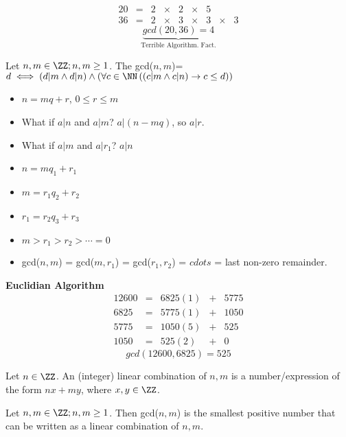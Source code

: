 \begin{example}
\[ \begin{matrix}20 & = & 2 & \times & 2 & \times & 5 \\
         36 & = & 2 & \times & 3 & \times & 3 & \times & 3\end{matrix}\]
\[\underbrace{gcd(20,36)=4}_{\text{Terrible Algorithm. Fact.}}\]
\end{example}
\begin{definition}
Let $n,m\in \ZZ; n,m \ge 1$. The gcd($n,m$)=$d \iff (d|m \wedge d|n) \wedge \left( \forall c \in \NN \left( (c|m \wedge c|n) \to c \le d \right) \right)$

\begin{itemize}
\item $n=mq+r$, $0\le r \le m$
\item What if $a|n$ and $a|m$? $a|(n-mq)$, so $a|r$.
\item What if $a|m$ and $a|r_1$? $a|n$
\item $n=mq_1+r_1$
\item $m=r_1q_2+r_2$
\item $r_1=r_2q_3+r_3$
\item $m > r_1 > r_2 > \cdots = 0$
\item gcd($n,m$) = gcd($m,r_1$) = gcd($r_1,r_2$) = $cdots$ = last non-zero remainder.
\end{itemize}
\end{definition}
\begin{example}
\textbf{Euclidian Algorithm}
\[ \begin{matrix} 12600 & = & 6825(1) & + & 5775 \\
                  6825  & = & 5775(1) & + & 1050 \\
                  5775  & = & 1050(5) & + & 525  \\
                  1050  & = & 525(2)  & + & 0\end{matrix} \]
\[ gcd(12600,6825)=525 \]
\end{example}

\begin{definition}
Let $n\in\ZZ$. An (integer) linear combination of $n,m$ is a number/expression of the form $nx+my$, where $x,y\in\ZZ$.
\end{definition}

\begin{theorem}
Let $n,m\in\ZZ; n,m\ge 1$. Then gcd($n,m$) is the smallest positive number that can be written as a linear combination of $n,m$.
\end{theorem}





